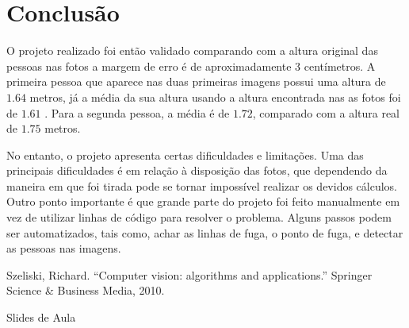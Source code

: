 \documentclass[a4paper, 12pt]{article}
\begin{document}
    \section*{Conclusão}
        O projeto realizado foi então validado comparando com a altura original das pessoas nas fotos a margem de erro é de aproximadamente 3 centímetros. A primeira pessoa que aparece nas duas primeiras imagens possui uma altura de $1.64$ metros, já a média da sua altura usando a altura encontrada nas as fotos foi de $1.61$ . Para a segunda pessoa, a média é de $1.72$, comparado com a altura real de $1.75$ metros.

        No entanto, o projeto apresenta certas dificuldades e limitações. Uma das principais dificuldades é em relação à disposição das fotos, que dependendo da maneira em que foi tirada pode se tornar impossível realizar os devidos cálculos. Outro ponto importante é que grande parte do projeto foi feito manualmente em vez de utilizar linhas de código para resolver o problema. Alguns passos podem ser automatizados, tais como, achar as linhas de fuga, o ponto de fuga, e detectar as pessoas nas imagens.

	\begin{thebibliography}{9}

        Szeliski, Richard. ``Computer vision: algorithms and applications.'' Springer Science \& Business Media, 2010.

        Slides de Aula


    \end{thebibliography}
\end{document}
